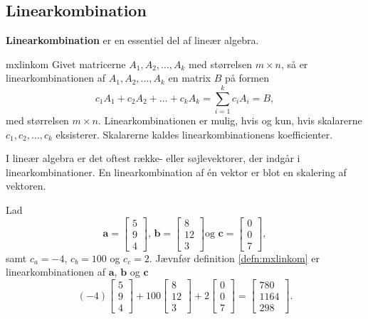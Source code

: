 \subsection{Linearkombination}
%
%
\textbf{Linearkombination} er en essentiel del af lineær algebra. 
%
\begin{defn}{}{mxlinkom}
Givet matricerne $A_1, A_2, \ldots, A_k$ med størrelsen $m \times n$, så er linearkombinationen af $A_1, A_2, \ldots, A_k$ en matrix $B$ på formen 
%
$$c_1A_1+c_2A_2+\ldots+c_kA_k=\sum\limits_{i=1}^k c_iA_i=B,$$
%
med størrelsen $m \times n$. 
Linearkombinationen er mulig, hvis og kun, hvis skalarerne $c_1, c_2, \ldots, c_k$ eksisterer. 
Skalarerne kaldes linearkombinationens koefficienter.
\end{defn}
%
%
\noindent 
%
I lineær algebra er det oftest række- eller søjlevektorer, der indgår i linearkombinationer. 
En linearkombination af én vektor er blot en skalering af vektoren.
\\
%
%
\begin{eks}
Lad 
$$
\textbf{a}=
\begin{bmatrix}
5 \\
9 \\
4
\end{bmatrix}
\text{, }
\textbf{b}=
\begin{bmatrix}
8  \\
12 \\ 
3
\end{bmatrix}
\text{og }
\textbf{c}=
\begin{bmatrix}
0 \\
0 \\
7
\end{bmatrix},
$$
samt $c_a=-4$, $c_b=100$ og $c_c=2$. 
Jævnfør definition \ref{defn:mxlinkom} er linearkombinationen af $\textbf{a}$, $\textbf{b}$ og $\textbf{c}$
$$
(-4)
\begin{bmatrix}
5 \\ 
9 \\ 
4
\end{bmatrix}
+
100
\begin{bmatrix}
8 \\
12 \\ 
3
\end{bmatrix}
+
2
\begin{bmatrix}
0 \\
0 \\ 
7
\end{bmatrix}
=
\begin{bmatrix}
780 \\
1164 \\ 
298
\end{bmatrix}
\text{.}
$$
\end{eks}
